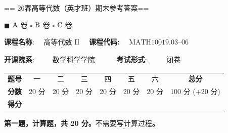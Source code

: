 \newcommand{\Span}{\operatorname{span}}
\newcommand{\Ker}{\operatorname{Ker}}

== 26春高等代数（英才班）期末参考答案==

\begin{center}

$\blacksquare$ ${\rm A}$ 卷 \quad $\square$ ${\rm B}$ 卷 \quad $\square$ ${\rm C}$ 卷

\textbf{课程名称}: $\underline{\quad\text{高等代数 II}\quad}$ \quad
\textbf{课程代码:} $\underline{\quad\text{MATH10019.03--06}\quad}$

\textbf{开课院系}: $\underline{\qquad\ 数学科学学院\qquad\ }$ \quad\ 
\textbf{考试形式}: $\underline{\qquad\ \ 闭卷\qquad\ \ }$


\begin{tabular}{|c|c|c|c|c|c|c|c|}
\textbf{题号} & 一 & 二 & 三 & 四 & 五 & 六 & \textbf{总分} \\
\textbf{分数} & 20 分 & 20 分 & 20 分 & 20 分 & 20 分 & 20 分 & 100 分 (+20 分) \\
\textbf{得分} & & & & & & & 
\end{tabular}
\end{center}

\textbf{第一题，计算题，共 20 分。$\underline{不需要写计算过程}$。}

